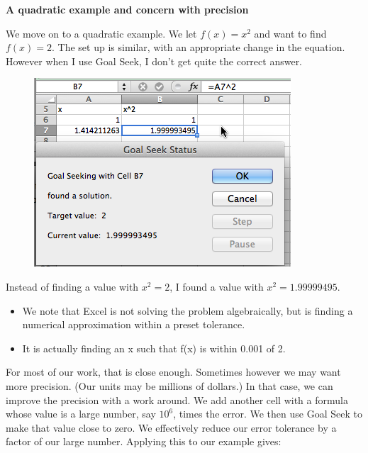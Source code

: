 \documentclass[10pt,]{book}
\newcommand{\terminology}[1]{\textbf{#1}}
\theoremstyle{plain}
\theoremstyle{definition}
\newenvironment{assemblage-untitled}{\mdfsetup{%
roundcorner=2ex, backgroundcolor=blue!5,linecolor=blue!75!black,}%
\begin{mdframed}}{\end{mdframed}}
\theoremstyle{definition}
\begin{document}
%
\par

\terminology{A quadratic example and concern with precision}
%
\par


We move on to a quadratic example.  We let \(f(x)=x^2\) and want to find \(f(x)=2\).  The set up is similar, with an appropriate change in the equation.  However when I use Goal Seek, I don't get quite the correct answer.

  \leavevmode%
\begin{figure}
\centering
\includegraphics[width=0.8\linewidth]{images/sec1-6-4.png}
\end{figure}
 

%
\par

Instead of finding a value with \(x^2 = 2\), I found a value with \(x^2 = 1.99999495\).  
\begin{assemblage-untitled}\label{assemblage-12}

\leavevmode%
\begin{itemize}[label=\textbullet]
\item{}We note that Excel is not solving the problem algebraically, but is finding a numerical approximation within a preset tolerance. %
\item{}It is actually finding an x such that f(x) is within 0.001 of 2.  %
\end{itemize}
%
\end{assemblage-untitled}

For most of our work, that is close enough.  Sometimes however we may want more precision.  (Our units may be millions of dollars.)  In that case, we can improve the precision with a work around.  We add another cell with a formula whose value is a large number, say \(10^6\), times the error.  We then use Goal Seek to make that value close to zero.  We effectively reduce our error tolerance by a factor of our large number.  Applying this to our example gives:
\end{document}
